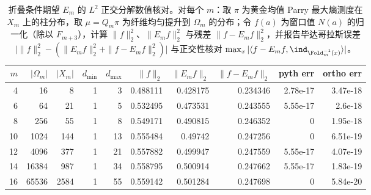 \begin{table}[H]
\centering
\scriptsize
\setlength{\tabcolsep}{4pt}
\caption{折叠条件期望 $E_m$ 的 $L^2$ 正交分解数值核对。对每个 $m$：取 $\pi$ 为黄金均值 Parry 最大熵测度在 $X_m$ 上的柱分布，取 $\mu=Q_m\pi$ 为纤维均匀提升到 $\Omega_m$ 的分布；令 $f(a)$ 为窗口值 $N(a)$ 的归一化（除以 $F_{m+3}$），计算 $\|f\|_2^2$、$\|E_m f\|_2^2$ 与残差 $\|f-E_m f\|_2^2$，并报告毕达哥拉斯误差 $\bigl|\|f\|_2^2-(\|E_m f\|_2^2+\|f-E_m f\|_2^2)\bigr|$ 与正交性核对 $\max_x|\langle f-E_m f,\ind_{\Fold_m^{-1}(x)}\rangle|$。}
\label{tab:fold_conditional_expectation_pythagoras}
\begin{tabular}{rrrrrrrrrr}
\toprule
$m$ & $|\Omega_m|$ & $|X_m|$ & $d_{\min}$ & $d_{\max}$ & $\|f\|_2$ & $\|E_m f\|_2$ & $\|f-E_m f\|_2$ & pyth err & ortho err\\
\midrule
4 & 16 & 8 & 1 & 3 & 0.488111 & 0.428175 & 0.234346 & 2.78e-17 & 3.47e-18\\
6 & 64 & 21 & 1 & 5 & 0.532495 & 0.473531 & 0.243555 & 5.55e-17 & 2.6e-18\\
8 & 256 & 55 & 1 & 8 & 0.549171 & 0.490815 & 0.246352 & 0 & 1.95e-18\\
10 & 1024 & 144 & 1 & 13 & 0.555484 & 0.49742 & 0.247256 & 0 & 6.51e-19\\
12 & 4096 & 377 & 1 & 21 & 0.557882 & 0.499947 & 0.247559 & 5.55e-17 & 4.07e-19\\
14 & 16384 & 987 & 1 & 34 & 0.558795 & 0.500914 & 0.247662 & 5.55e-17 & 1.83e-19\\
16 & 65536 & 2584 & 1 & 55 & 0.559142 & 0.501284 & 0.247698 & 0 & 5.84e-20\\
\bottomrule
\end{tabular}
\end{table}
